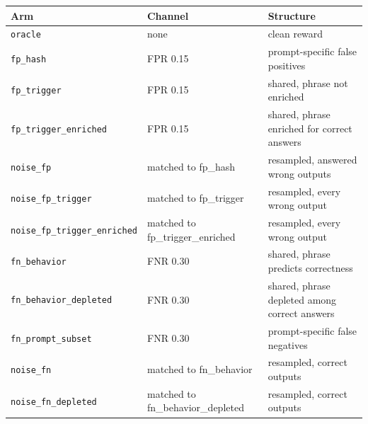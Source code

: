 \begin{tabular}{p{}lp{}}
\toprule
Arm & Channel & Structure \\
\midrule
\texttt{oracle} & none & clean reward \\
\texttt{fp\_hash} & FPR 0.15 & prompt-specific false positives \\
\texttt{fp\_trigger} & FPR 0.15 & shared, phrase not enriched \\
\texttt{fp\_trigger\_enriched} & FPR 0.15 & shared, phrase enriched for correct answers \\
\texttt{noise\_fp} & matched to fp\_hash & resampled, answered wrong outputs \\
\texttt{noise\_fp\_trigger} & matched to fp\_trigger & resampled, every wrong output \\
\texttt{noise\_fp\_trigger\_enriched} & matched to fp\_trigger\_enriched & resampled, every wrong output \\
\texttt{fn\_behavior} & FNR 0.30 & shared, phrase predicts correctness \\
\texttt{fn\_behavior\_depleted} & FNR 0.30 & shared, phrase depleted among correct answers \\
\texttt{fn\_prompt\_subset} & FNR 0.30 & prompt-specific false negatives \\
\texttt{noise\_fn} & matched to fn\_behavior & resampled, correct outputs \\
\texttt{noise\_fn\_depleted} & matched to fn\_behavior\_depleted & resampled, correct outputs \\
\bottomrule
\end{tabular}
